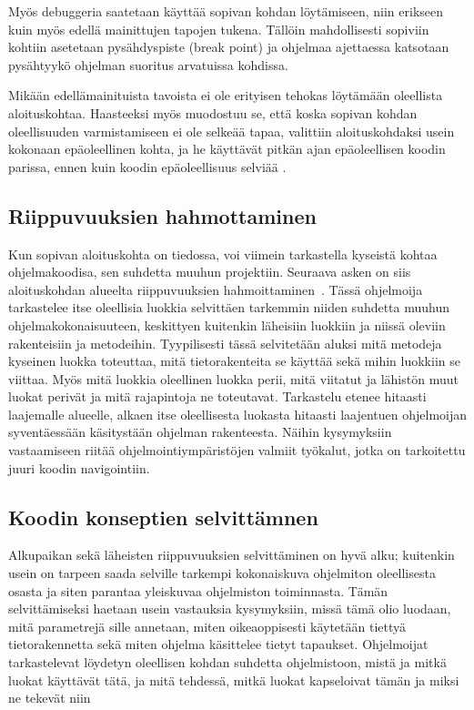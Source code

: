 \documentclass[finnish]{../tktltiki2}
\theoremstyle{definition}
\theoremstyle{remark}
\begin{document}
Myös debuggeria saatetaan käyttää sopivan kohdan löytämiseen, niin erikseen kuin myös edellä mainittujen tapojen tukena. Tällöin mahdollisesti sopiviin kohtiin asetetaan pysähdyspiste (break point) ja ohjelmaa ajettaessa katsotaan pysähtyykö ohjelman suoritus arvatuissa kohdissa.

Mikään edellämainituista tavoista ei ole erityisen tehokas löytämään oleellista aloituskohtaa.
Haasteeksi myös muodostuu se, että koska sopivan kohdan oleellisuuden varmistamiseen ei ole selkeää tapaa, valittiin aloituskohdaksi usein kokonaan epäoleellinen kohta, ja he käyttävät pitkän ajan epäoleellisen koodin parissa, ennen kuin koodin epäoleellisuus selviää \cite{eliciting-design-requirements-for-maintenance-oriented-ides}.

\subsection{Riippuvuuksien hahmottaminen}
Kun sopivan aloituskohta on tiedossa, voi viimein tarkastella kyseistä kohtaa ohjelmakoodisa, sen suhdetta muuhun projektiin. Seuraava asken on siis aloituskohdan alueelta riippuvuuksien hahmoittaminen~\cite{questions-during-software-evolution-tasks}.
Tässä ohjelmoija tarkastelee itse oleellisia luokkia selvittäen tarkemmin niiden suhdetta muuhun ohjelmakokonaisuuteen, keskittyen kuitenkin läheisiin luokkiin ja niissä oleviin rakenteisiin ja metodeihin. Tyypilisesti tässä selvitetään aluksi mitä metodeja kyseinen luokka toteuttaa, mitä tietorakenteita se käyttää sekä mihin luokkiin se viittaa. Myös mitä luokkia oleellinen luokka perii, mitä viitatut ja lähistön muut luokat perivät ja mitä rajapintoja ne toteutavat. Tarkastelu etenee hitaasti laajemalle alueelle, alkaen itse oleellisesta luokasta hitaasti laajentuen ohjelmoijan syventäessään käsitystään ohjelman rakenteesta. Näihin kysymyksiin vastaamiseen riitää ohjelmointiympäristöjen valmiit työkalut, jotka on tarkoitettu juuri koodin navigointiin.

\subsection{Koodin konseptien selvittämnen}
Alkupaikan sekä läheisten riippuvuuksien selvittäminen on hyvä alku; kuitenkin usein on tarpeen saada selville tarkempi kokonaiskuva ohjelmiton oleellisesta osasta ja siten parantaa yleiskuvaa ohjelmiston toiminnasta. Tämän selvittämiseksi haetaan usein vastauksia kysymyksiin, missä tämä olio luodaan, mitä parametrejä sille annetaan, miten oikeaoppisesti käytetään tiettyä tietorakennetta sekä miten ohjelma käsittelee tietyt tapaukset. Ohjelmoijat tarkastelevat löydetyn oleellisen kohdan suhdetta ohjelmistoon, mistä ja mitkä luokat käyttävät tätä, ja mitä tehdessä, mitkä luokat kapseloivat tämän ja miksi ne tekevät niin~\cite{questions-during-software-evolution-tasks,eliciting-design-requirements-for-maintenance-oriented-ides}
\end{document}
